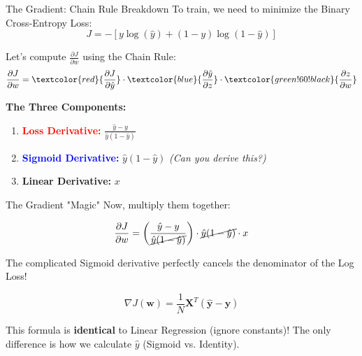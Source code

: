 \begin{frame}{The Gradient: Chain Rule Breakdown}
    To train, we need to minimize the Binary Cross-Entropy Loss:
    $$ J = - [y \log(\hat{y}) + (1-y) \log(1-\hat{y})] $$

    Let's compute $\frac{\partial J}{\partial w}$ using the Chain Rule:
    $$ \frac{\partial J}{\partial w} = \textcolor{red}{\frac{\partial J}{\partial \hat{y}}} \cdot \textcolor{blue}{\frac{\partial \hat{y}}{\partial z}} \cdot \textcolor{green!60!black}{\frac{\partial z}{\partial w}} $$

    \vspace{1em}
    \textbf{The Three Components:}
    \begin{enumerate}
        \item \textcolor{red}{\textbf{Loss Derivative:}} $\frac{\hat{y} - y}{\hat{y}(1-\hat{y})}$
        \item \textcolor{blue}{\textbf{Sigmoid Derivative:}} $\hat{y}(1-\hat{y})$ \hfill \textit{(Can you derive this?)}
        \item \textcolor{green!60!black}{\textbf{Linear Derivative:}} $x$
    \end{enumerate}
\end{frame}

\begin{frame}{The Gradient "Magic"}
    Now, multiply them together:
    
    $$ \frac{\partial J}{\partial w} = \left( \frac{\hat{y} - y}{\cancel{\hat{y}(1-\hat{y})}} \right) \cdot \cancel{\hat{y}(1-\hat{y})} \cdot x $$
    
    The complicated Sigmoid derivative perfectly cancels the denominator of the Log Loss!

    \begin{tcolorbox}[colback=green!5, title=\textbf{Final Gradient Update}]
        $$ \nabla J(\mathbf{w}) = \frac{1}{N} \mathbf{X}^T (\mathbf{\hat{y}} - \mathbf{y}) $$
    \end{tcolorbox}
    
    \begin{tcolorbox}[colback=yellow!10, colframe=orange!50, title=\textbf{Observation}]
        This formula is \textbf{identical} to Linear Regression (ignore constants)!
        The only difference is how we calculate $\hat{y}$ (Sigmoid vs. Identity).
    \end{tcolorbox}
\end{frame}

